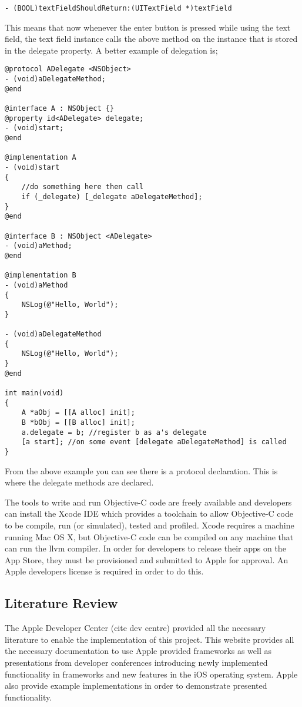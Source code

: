 \documentclass[12pt]{report}
\begin{document}
\begin{verbatim} 
- (BOOL)textFieldShouldReturn:(UITextField *)textField 
\end{verbatim}

This means that now whenever the enter button is pressed while using the text field, the text field instance calls the above method on the instance that is stored in the delegate property. A better example of delegation is;

\begin{verbatim}
@protocol ADelegate <NSObject>
- (void)aDelegateMethod;
@end

@interface A : NSObject {}
@property id<ADelegate> delegate;
- (void)start;
@end

@implementation A
- (void)start
{
    //do something here then call
    if (_delegate) [_delegate aDelegateMethod];
}
@end

@interface B : NSObject <ADelegate>
- (void)aMethod;
@end

@implementation B
- (void)aMethod
{
    NSLog(@"Hello, World");
}

- (void)aDelegateMethod
{
	NSLog(@"Hello, World");
}
@end

int main(void) 
{
	A *aObj = [[A alloc] init];
	B *bObj = [[B alloc] init];
	a.delegate = b; //register b as a's delegate
	[a start]; //on some event [delegate aDelegateMethod] is called
}
\end{verbatim}

From the above example you can see there is a protocol declaration. This is where the delegate methods are declared. 

The tools to write and run Objective-C code are freely available and developers can install the Xcode IDE which provides a toolchain to allow Objective-C code to be compile, run (or simulated), tested and profiled. Xcode requires a machine running Mac OS X, but Objective-C code can be compiled on any machine that can run the llvm compiler. In order for developers to release their apps on the App Store, they must be provisioned and submitted to Apple for approval. An Apple developers license is required in order to do this.

\subsection{Literature Review}

The Apple Developer Center (cite dev centre) provided all the necessary literature to enable the implementation of this project. This website provides all the necessary documentation to use Apple provided frameworks as well as presentations from developer conferences introducing newly implemented functionality in frameworks and new features in the iOS operating system. Apple also provide example implementations in order to demonstrate presented functionality.
\end{document}
